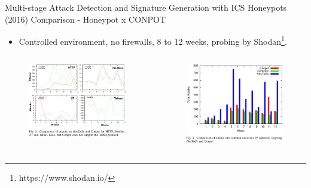 \documentclass[compress]{beamer}
\begin{document}
\begin{frame}{Multi-stage Attack Detection and Signature Generation with ICS Honeypots (2016)}
    Comparison - Honeypot x CONPOT
    \begin{itemize}
     \item Controlled environment, no firewalls, 8 to 12 weeks, probing by Shodan\footnote{https://www.shodan.io/}.
    \end{itemize}
    \begin{columns}
     \begin{column}{0.55\textwidth}
      \begin{figure}
      \centering
      \includegraphics[width=1.0\textwidth]{./images/hostage-conpot-comparison.png}
      \label{fig:hostage-conpot-comparison}
      \end{figure}
     \end{column}
     \begin{column}{0.45\textwidth}
      \begin{figure}
      \centering
      \includegraphics[width=1.0\textwidth]{./images/hostage-ip-sources.png}

\end{figure}
\end{column}
\end{columns}
\end{frame}
\end{document}
